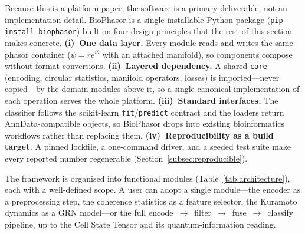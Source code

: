 \documentclass[preprint,12pt,amsmath,amssymb,superscriptaddress,floatfix]{revtex4-2}
\begin{document}
Because this is a platform paper, the software is a primary deliverable, not an
implementation detail. BioPhasor is a single installable Python package
(\texttt{pip install biophasor}) built on four design principles that the rest of
this section makes concrete. \textbf{(i)~One data layer.} Every module reads and
writes the same phasor container ($\psi=r e^{i\theta}$ with an attached manifold),
so components compose without format conversions. \textbf{(ii)~Layered
dependency.} A shared \texttt{core} (encoding, circular statistics, manifold
operators, losses) is imported---never copied---by the domain modules above it, so
a single canonical implementation of each operation serves the whole platform.
\textbf{(iii)~Standard interfaces.} The classifier follows the scikit-learn
\texttt{fit}/\texttt{predict} contract and the loaders return AnnData-compatible
objects, so BioPhasor drops into existing bioinformatics workflows rather than
replacing them. \textbf{(iv)~Reproducibility as a build target.} A pinned
lockfile, a one-command driver, and a seeded test suite make every reported number
regenerable (Section~\ref{subsec:reproducible}).

The framework is organised into functional modules
(Table~\ref{tab:architecture}), each with a well-defined scope. A user can adopt a
single module---the encoder as a preprocessing step, the coherence statistics as a
feature selector, the Kuramoto dynamics as a GRN model---or the full
encode~$\to$~filter~$\to$~fuse~$\to$~classify pipeline, up to the Cell State Tensor
and its quantum-information reading.
\end{document}
